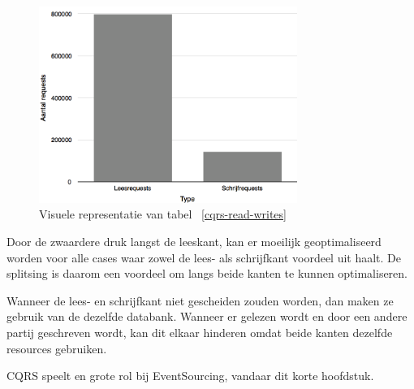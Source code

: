 \begin{figure}[h]
\caption{Visuele representatie van tabel ~\ref{cqrs-read-writes}}
\centering
\includegraphics[width=0.75\textwidth]{img/lees-en-schrijfkant}
\end{figure}

Door de zwaardere druk langst de leeskant, kan er moeilijk geoptimaliseerd worden voor alle cases waar zowel de lees- als schrijfkant voordeel uit haalt. De splitsing is daarom een voordeel om langs beide kanten te kunnen optimaliseren.

Wanneer de lees- en schrijfkant niet gescheiden zouden worden, dan maken ze gebruik van de dezelfde databank. Wanneer er gelezen wordt en door een andere partij geschreven wordt, kan dit elkaar hinderen omdat beide kanten dezelfde resources gebruiken.

\gls{CQRS} speelt en grote rol bij EventSourcing, vandaar dit korte hoofdstuk.
